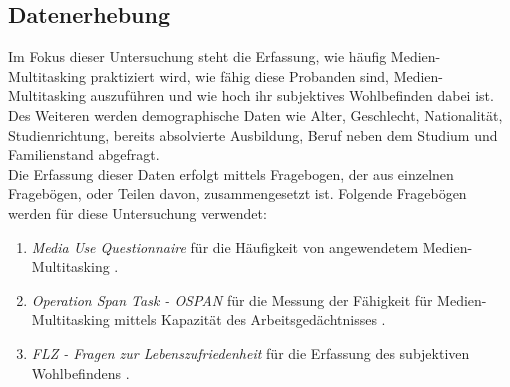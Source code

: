 \subsection*{Datenerhebung}
Im Fokus dieser Untersuchung steht die Erfassung, wie häufig Medien-Multitasking praktiziert wird, wie fähig diese Probanden sind, Medien-Multitasking auszuführen und wie hoch ihr subjektives Wohlbefinden dabei ist. \\ 
Des Weiteren werden demographische Daten wie Alter, Geschlecht, Nationalität, Studienrichtung, bereits absolvierte Ausbildung, Beruf neben dem Studium und Familienstand abgefragt.\\
Die Erfassung dieser Daten erfolgt mittels Fragebogen, der aus einzelnen Fragebögen, oder Teilen davon, zusammengesetzt ist. Folgende Fragebögen werden für diese Untersuchung verwendet:
\begin{enumerate}
    \item \textit{Media Use Questionnaire} für die Häufigkeit von angewendetem Medien-Multitasking \cite{Ophir2009}.
    \item \textit{Operation Span Task - OSPAN} für die Messung der Fähigkeit für Medien-Multitasking mittels Kapazität des Arbeitsgedächtnisses \cite{Unsworth2005, Sanbonmatsu2013}.
    \item \textit{FLZ - Fragen zur Lebenszufriedenheit} für die Erfassung des subjektiven Wohlbefindens \cite{Braehler1999}.
\end{enumerate}
